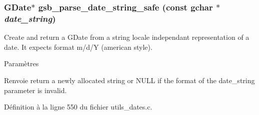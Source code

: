 \subsubsection[{gsb\_\-parse\_\-date\_\-string\_\-safe}]{\setlength{\rightskip}{0pt plus 5cm}GDate$\ast$ gsb\_\-parse\_\-date\_\-string\_\-safe (const gchar $\ast$ {\em date\_\-string})}\label{utils__dates_8h_a79ec6369fd094262ad9374b115068c17}
Create and return a GDate from a string locale independant representation of a date. It expects format m/d/Y (american style).


\begin{DoxyParams}{Paramètres}
\item[{\em }]\end{DoxyParams}
\begin{DoxyReturn}{Renvoie}
return a newly allocated string or NULL if the format of the date\_\-string parameter is invalid. 
\end{DoxyReturn}


Définition à la ligne 550 du fichier utils\_\-dates.c.

